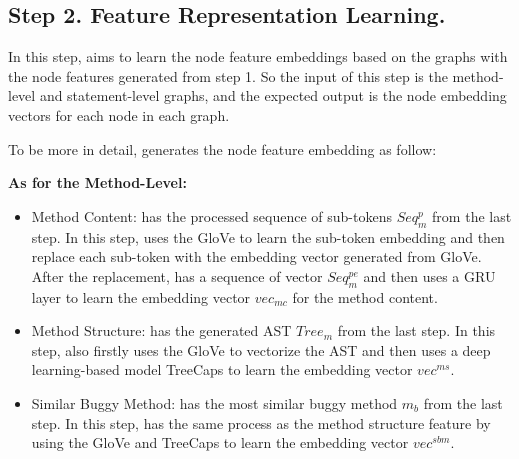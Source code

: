 \subsection{Step 2. Feature Representation Learning.}

In this step, \tool aims to learn the node feature embeddings based on the graphs with the node features generated from step 1. So the input of this step is the method-level and statement-level graphs, and the expected output is the node embedding vectors for each node in each graph.

To be more in detail, \tool generates the node feature embedding as follow:

{\bf As for the Method-Level:}
\begin{itemize}
	\item Method Content: \tool has the processed sequence of sub-tokens $Seq^p_m$ from the last step. In this step, \tool uses the GloVe \cite{pennington2014glove} to learn the sub-token embedding and then replace each sub-token with the embedding vector generated from GloVe. After the replacement, \tool has a sequence of vector $Seq^{pe}_m$ and then uses a GRU layer \cite{cho2014learning} to learn the embedding vector $vec_{mc}$ for the method content. 
	
	\item Method Structure: \tool has the generated AST $Tree_m$ from the last step. In this step, \tool also firstly uses the GloVe to vectorize the AST and then uses a deep learning-based model TreeCaps \cite{bui2021treecaps} to learn the embedding vector $vec^{ms}$.
	
	\item Similar Buggy Method: \tool has the most similar buggy method $m_b$ from the last step. In this step, \tool has the same process as the method structure feature by using the GloVe and TreeCaps to learn the embedding vector $vec^{sbm}$.
\end{itemize}

